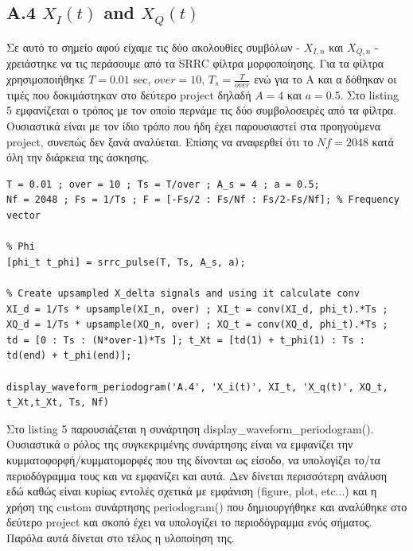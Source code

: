 \documentclass[11pt]{article}
\begin{document}
    \subsection*{A.4 $X_I(t)$ and $X_Q(t)$}
    
    Σε αυτό το σημείο αφού είχαμε τις δύο ακολουθίες συμβόλων - $X_{I,n}$ και $X_{Q,n}$ - χρειάστηκε να τις περάσουμε από τα SRRC φίλτρα μορφοποίησης.
    Για τα φίλτρα χρησιμοποιήθηκε $T=0.01$ sec, $over = 10$, $T_s = \frac{T}{over}$ ενώ για το Α και α δόθηκαν οι τιμές που δοκιμάστηκαν στο δεύτερο project δηλαδή $Α=4$ και $a=0.5$. 
    Στο listing 5 εμφανίζεται ο τρόπος με τον οποίο περνάμε τις δύο συμβολοσειρές από τα φίλτρα. 
    Ουσιαστικά είναι με τον ίδιο τρόπο που ήδη έχει παρουσιαστεί στα προηγούμενα project, συνεπώς δεν ξανά αναλύεται. 
    Επίσης να αναφερθεί ότι το $Nf=2048$ κατά όλη την διάρκεια της άσκησης.
    
    \begin{lstlisting}[caption = {A.4 \texttt{Calculate $X_I(t)$ and $X_Q(t)$}}]
% A.4
T = 0.01 ; over = 10 ; Ts = T/over ; A_s = 4 ; a = 0.5;
Nf = 2048 ; Fs = 1/Ts ; F = [-Fs/2 : Fs/Nf : Fs/2-Fs/Nf]; % Frequency vector

% Phi
[phi_t t_phi] = srrc_pulse(T, Ts, A_s, a);

% Create upsampled X_delta signals and using it calculate conv
XI_d = 1/Ts * upsample(XI_n, over) ; XI_t = conv(XI_d, phi_t).*Ts ;
XQ_d = 1/Ts * upsample(XQ_n, over) ; XQ_t = conv(XQ_d, phi_t).*Ts ;
td = [0 : Ts : (N*over-1)*Ts ]; t_Xt = [td(1) + t_phi(1) : Ts : td(end) + t_phi(end)];

display_waveform_periodogram('A.4', 'X_i(t)', XI_t, 'X_q(t)', XQ_t, t_Xt,t_Xt, Ts, Nf)
    \end{lstlisting}
    
    \par \noindent
    Στο listing 5 παρουσιάζεται η συνάρτηση display\_waveform\_periodogram(). Ουσιαστικά ο ρόλος της συγκεκριμένης συνάρτησης είναι να εμφανίζει 
    την κυμματοφορφή/κυμματομορφές που της δίνονται ως είσοδο, να υπολογίζει το/τα περιοδόγραμμα τους και να εμφανίζει και αυτά. 
    Δεν δίνεται περισσότερη ανάλυση εδώ καθώς είναι κυρίως εντολές σχετικά με εμφάνιση (figure, plot, etc...) και η χρήση της custom συνάρτησης periodogram() που δημιουργήθηκε και αναλύθηκε στο δεύτερο project και σκοπό έχει να υπολογίζει το περιοδόγραμμα ενός σήματος. 
    Παρόλα αυτά δίνεται στο τέλος η υλοποίηση της.
    
\end{document}
